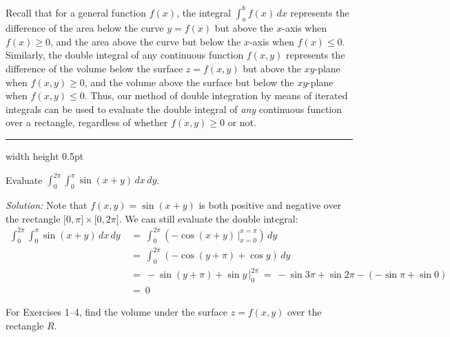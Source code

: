 Recall that for a general function $f(x)$, the integral $\int_a^b f(x)\, dx$ represents the difference of the area
below the curve $y=f(x)$ but above the $x$-axis when $f(x) \ge 0$, and the area above the curve but below the $x$-axis
when $f(x) \le 0$. Similarly, the double integral of any continuous function $f(x,y)$ represents the difference of the
volume below the surface $z=f(x,y)$ but above the $xy$-plane when $f(x,y) \ge 0$, and the volume above the surface but
below the $xy$-plane when $f(x,y) \le 0$. Thus, our method of double integration by means of iterated integrals can
be used to evaluate the double integral of \emph{any} continuous function over a rectangle, regardless of whether
$f(x,y) \ge 0$ or not.

\vspace{3mm}
\hrule width \textwidth height 0.5pt
\begin{exmp}
 Evaluate $\displaystyle\int_0^{2\pi} \displaystyle\int_0^{\pi} \sin (x+y) \,dx\,dy$.\vspace{1mm}
 \par\noindent \emph{Solution:} Note that $f(x,y) = \sin (x+y)$ is both positive and negative over the rectangle
 $\lbrack 0,\pi \rbrack \times \lbrack 0,2\pi \rbrack$. We can still evaluate the double integral:
 \begin{align*}
  \int_0^{2\pi} \int_0^{\pi} \sin (x+y) \,dx\,dy
   ~&=~ \int_0^{2\pi} \left( -\cos (x+y) \,\Big|_{x=0}^{x=\pi} \right) \,dy\\
   &=~ \int_0^{2\pi} (-\cos (y+\pi) + \cos y) \,dy\\
   &=~ -\sin (y+\pi) + \sin y \,\Big|_0^{2\pi} ~=~ -\sin 3\pi + \sin 2\pi - (-\sin \pi + \sin 0)\\
   &=~ 0
 \end{align*}
\end{exmp}
\startexercises\label{sec3dot1}
\par\noindent For Exercises 1--4, find the volume under the surface $z=f(x,y)$ over the rectangle $R$.
